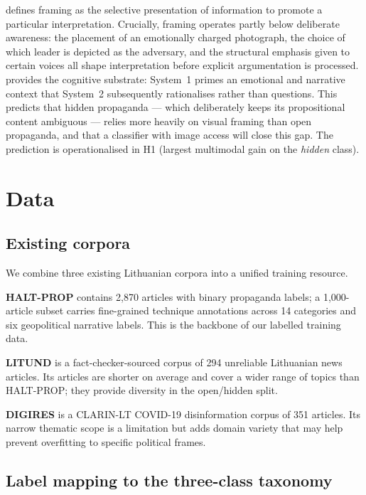 \documentclass[12pt,a4paper]{article}
\begin{document}
\textcite{entman1993framing} defines framing as the selective presentation of
information to promote a particular interpretation.
Crucially, framing operates partly below deliberate awareness: the placement of
an emotionally charged photograph, the choice of which leader is depicted as
the adversary, and the structural emphasis given to certain voices all shape
interpretation before explicit argumentation is processed.
\textcite{kahneman2011thinking} provides the cognitive substrate: System~1
primes an emotional and narrative context that System~2 subsequently rationalises
rather than questions.
This predicts that hidden propaganda --- which deliberately keeps its
propositional content ambiguous --- relies more heavily on visual framing than
open propaganda, and that a classifier with image access will close this gap.
The prediction is operationalised in H1 (largest multimodal gain on the
\emph{hidden} class).


\section{Data}
\label{sec:data}

\subsection{Existing corpora}

We combine three existing Lithuanian corpora into a unified training resource.

\textbf{HALT-PROP} \parencite{haltprop2025} contains 2,870 articles with binary
propaganda labels; a 1,000-article subset carries fine-grained technique
annotations across 14 categories and six geopolitical narrative labels.
This is the backbone of our labelled training data.

\textbf{LITUND} is a fact-checker-sourced corpus of 294 unreliable Lithuanian
news articles.
Its articles are shorter on average and cover a wider range of topics than
HALT-PROP; they provide diversity in the open/hidden split.

\textbf{DIGIRES} is a CLARIN-LT COVID-19 disinformation corpus of 351 articles.
Its narrow thematic scope is a limitation but adds domain variety that may help
prevent overfitting to specific political frames.

\subsection{Label mapping to the three-class taxonomy}
\label{sec:mapping}
\end{document}
